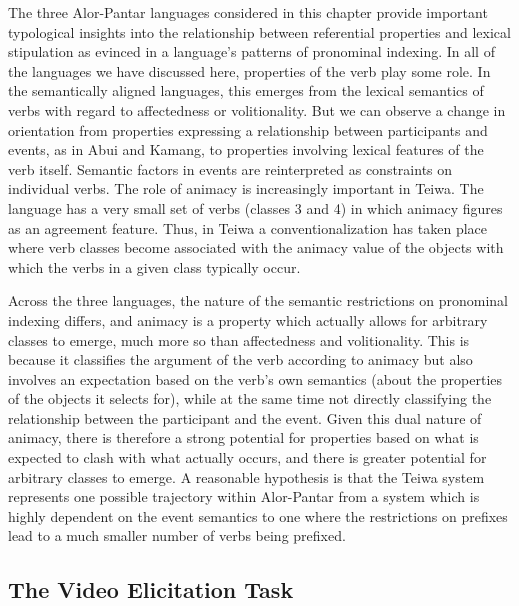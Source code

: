 The three Alor-Pantar languages considered in this chapter provide important typological insights into the relationship between referential properties and lexical stipulation as evinced in a language's patterns of pronominal indexing. In all of the languages we have discussed here, properties of the verb play some role. In the semantically aligned languages, this emerges from the lexical semantics of verbs with regard to affectedness or volitionality. But we can observe a change in orientation from properties expressing a relationship between participants and events, as in Abui and Kamang, to properties involving lexical features of the verb itself. Semantic factors in events are reinterpreted as constraints on individual verbs. The role of animacy is increasingly important in Teiwa. The language has a very small set of verbs (classes 3 and 4) in which animacy figures as an agreement feature. Thus, in Teiwa a conventionalization has taken place where verb classes become associated with the animacy value of the objects with which the verbs in a given class typically occur.

Across the three languages, the nature of the semantic restrictions on pronominal indexing differs, and animacy is a property which actually allows for arbitrary classes to emerge, much more so than affectedness and volitionality. This is because it classifies the argument of the verb according to animacy but also involves an expectation based on the verb's own semantics (about the properties of the objects it selects for), while at the same time not directly classifying the relationship between the participant and the event. Given this dual nature of animacy, there is therefore a strong potential for properties based on what is expected to clash with what actually occurs, and there is greater potential for arbitrary classes to emerge. A reasonable hypothesis is that the Teiwa system represents one possible trajectory within Alor-Pantar from a system which is highly dependent on the event semantics to one where the restrictions on prefixes lead to a much smaller number of verbs being prefixed. 

\startappendix
\subsection{The Video Elicitation Task} 
